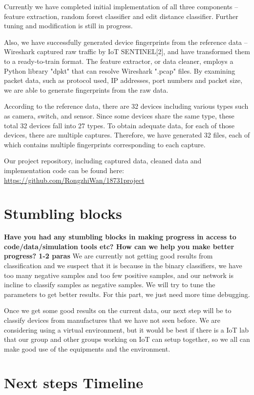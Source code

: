 \documentclass[twocolumn,10pt]{article}
\begin{document}
Currently we have completed initial implementation of all three components -- feature extraction, random forest classifier and edit distance classifier. Further tuning and modification is still in progress. 

Also, we have successfully generated device fingerprints from the reference data -- Wireshark captured raw traffic by IoT SENTINEL[2], and have transformed them to a ready-to-train format. The feature extractor, or data cleaner, employs a Python library "dpkt" that can resolve Wireshark ".pcap" files. By examining packet data, such as protocol used, IP addresses, port numbers and packet size, we are able to generate fingerprints from the raw data.

According to the reference data, there are 32 devices including various types such as camera, switch, and sensor. Since some devices share the same type, these total 32 devices fall into 27 types. To obtain adequate data, for each of those devices, there are multiple captures. Therefore, we have generated 32 files, each of which contains multiple fingerprints corresponding to each capture.

Our project repository, including captured data, cleaned data and implementation code can be found here:  
\url{https://github.com/RongzhiWan/18731project}

\section{Stumbling blocks}

{\bf Have you had any stumbling blocks in making progress in access to code/data/simulation tools etc? How can we help you make better progress? 1-2 paras}
We are currently not getting good results from classification and we suspect that it is because in the binary classifiers, we have too many negative samples and too few positive samples, and our network is incline to classify samples as negative samples. We will try to tune the parameters to get better results. For this part, we just need more time debugging.

Once we get some good results on the current data, our next step will be to classify devices from manufactures that we have not seen before. We are considering using a virtual environment, but it would be best if there is a IoT lab that our group and other groups working on IoT can setup together, so we all can make good use of the equipments and the environment.

\section{Next steps  Timeline}
\end{document}
